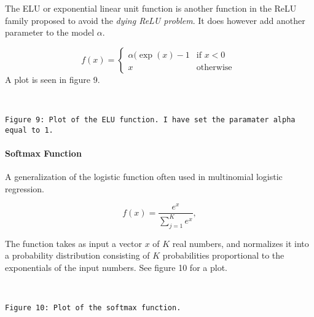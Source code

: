 \documentclass[11pt]{article}
\begin{document}
The ELU or exponential linear unit function is another function in the
ReLU family proposed to avoid the \emph{dying ReLU problem}. It does
however add another parameter to the model \(\alpha\).

\[
f(x) =
\left\{
    \begin{array}{ll}
        \alpha(\exp(x)-1  & \mbox{if } x < 0 \\
        x & \mbox{otherwise }
    \end{array}
\right.
\] 
A plot is seen in figure 9.

    \begin{center}
    \end{center}
    { \hspace*{\fill} \\}
    
    \begin{Verbatim}[commandchars=\\\{\}]
Figure 9: Plot of the ELU function. I have set the paramater alpha equal to 1.
    \end{Verbatim}

    \hypertarget{softmax-function}{%
\paragraph{Softmax Function}\label{softmax-function}}

A generalization of the logistic function often used in multinomial
logistic regression.

\[
f(x) = \frac{e^x}{\sum_{j=1}^K e^{x}},
\]

The function takes as input a vector \(x\) of \(K\) real numbers, and
normalizes it into a probability distribution consisting of \(K\)
probabilities proportional to the exponentials of the input numbers. See
figure 10 for a plot.

    \begin{center}
    \end{center}
    { \hspace*{\fill} \\}
    
    \begin{Verbatim}[commandchars=\\\{\}]
Figure 10: Plot of the softmax function.
    \end{Verbatim}
\end{document}
